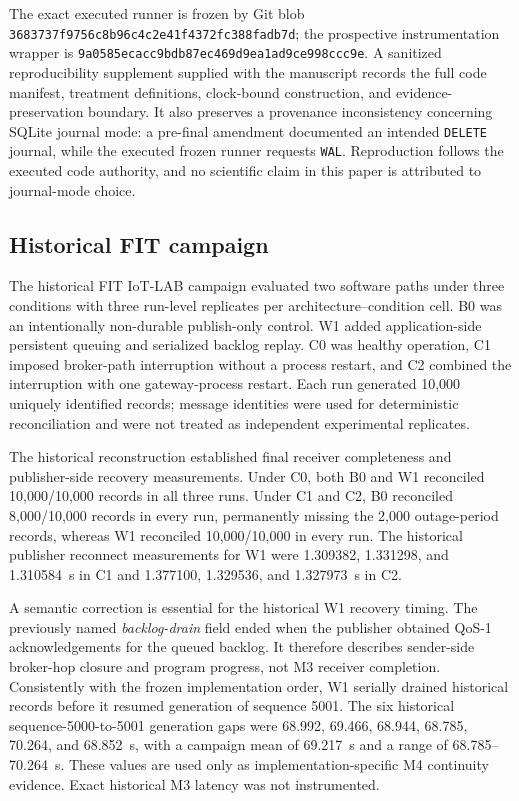 \documentclass[journal]{IEEEtran}
\begin{document}
The exact executed runner is frozen by Git blob \texttt{3683737f9756c8b96c4c2e41f4372fc388fadb7d}; the prospective instrumentation wrapper is \texttt{9a0585ecacc9bdb87ec469d9ea1ad9ce998ccc9e}. A sanitized reproducibility supplement supplied with the manuscript records the full code manifest, treatment definitions, clock-bound construction, and evidence-preservation boundary. It also preserves a provenance inconsistency concerning SQLite journal mode: a pre-final amendment documented an intended \texttt{DELETE} journal, while the executed frozen runner requests \texttt{WAL}. Reproduction follows the executed code authority, and no scientific claim in this paper is attributed to journal-mode choice.

\subsection{Historical FIT campaign}

The historical FIT IoT-LAB campaign \cite{fitlab} evaluated two software paths under three conditions with three run-level replicates per architecture--condition cell. B0 was an intentionally non-durable publish-only control. W1 added application-side persistent queuing and serialized backlog replay. C0 was healthy operation, C1 imposed broker-path interruption without a process restart, and C2 combined the interruption with one gateway-process restart. Each run generated 10,000 uniquely identified records; message identities were used for deterministic reconciliation and were not treated as independent experimental replicates.

The historical reconstruction established final receiver completeness and publisher-side recovery measurements. Under C0, both B0 and W1 reconciled 10,000/10,000 records in all three runs. Under C1 and C2, B0 reconciled 8,000/10,000 records in every run, permanently missing the 2,000 outage-period records, whereas W1 reconciled 10,000/10,000 in every run. The historical publisher reconnect measurements for W1 were 1.309382, 1.331298, and 1.310584~s in C1 and 1.377100, 1.329536, and 1.327973~s in C2.

A semantic correction is essential for the historical W1 recovery timing. The previously named \emph{backlog-drain} field ended when the publisher obtained QoS-1 acknowledgements for the queued backlog. It therefore describes sender-side broker-hop closure and program progress, not M3 receiver completion. Consistently with the frozen implementation order, W1 serially drained historical records before it resumed generation of sequence 5001. The six historical sequence-5000-to-5001 generation gaps were 68.992, 69.466, 68.944, 68.785, 70.264, and 68.852~s, with a campaign mean of 69.217~s and a range of 68.785--70.264~s. These values are used only as implementation-specific M4 continuity evidence. Exact historical M3 latency was not instrumented.
\end{document}
